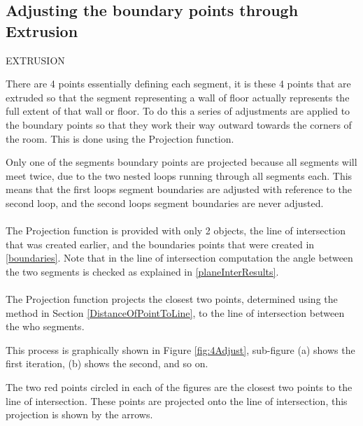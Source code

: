 		\subsection{Adjusting the boundary points through Extrusion}
		\label{Extrusion}
		EXTRUSION
		
			There are 4 points essentially defining each segment, it is these 4 points that are extruded so that the segment representing a wall of floor actually represents the full extent of that wall or floor. To do this a series of adjustments are applied to the boundary points so that they work their way outward towards the corners of the room. This is done using the Projection function.
			
			Only one of the segments boundary points are projected because all segments will meet twice, due to the two nested loops running through all segments each. This means that the first loops segment boundaries are adjusted with reference to the second loop, and the second loops segment boundaries are never adjusted.\\
			\\
			The Projection function is provided with only 2 objects, the line of intersection that was created earlier, and the boundaries points that were created in \ref{boundaries}. Note that in the line of intersection computation the angle between the two segments is checked as explained in \ref{planeInterResults}.\\
			\\
			The Projection function projects the closest two points, determined using the method in Section \ref{DistanceOfPointToLine}, to the line of intersection between the who segments.
			
			This process is graphically shown in Figure \ref{fig:4Adjust},  sub-figure (a) shows the first iteration, (b) shows the second, and so on.
			
			The two red points circled in each of the figures are the closest two points to the line of intersection. These points are projected onto the line of intersection, this projection is shown by the arrows.
			
